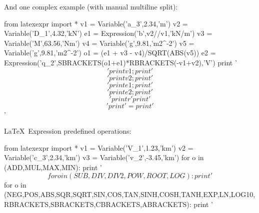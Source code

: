 \documentclass{report}
\begin{document}
And one complex example (with manual multiline split):
\begin{python}
	from latexexpr import *
	v1 = Variable('a_3',2.34,'m')
	v2 = Variable('D_1',4.32,'kN')
	e1 = Expression('b',v2//v1,'kN/m')
	v3 = Variable('M',63.56,'Nm')
	v4 = Variable('g',9.81,'m2^{-2}')
	v5 = Variable('g',9.81,'m2^{-2}')
	o1 = (e1 + v3 - v4)/SQRT(ABS(v5))
	e2 = Expression('q_2',SBRACKETS(o1+e1)*RBRACKETS(-v1+v2),'V')
	print '$$'
	print v1; print '$$\n$$'
	print v2; print '$$\n$$'
	print e1; print '$$\n$$'
	print e2; print '$$\n$$'
	print r'%
	print '$$\n$$'
	print '= %
	print '$$'
\end{python}

\LaTeX\ Expression predefined operations:
\begin{python}
	from latexexpr import *
	v1 = Variable('V_1',1.23,'km')
	v2 = Variable('c_3',2.34,'km')
	v3 = Variable('v_2',-3.45,'km')
	for o in (ADD,MUL,MAX,MIN):
	   print '$$ %
	for o in (SUB,DIV,DIV2,POW,ROOT,LOG):
	   print '$$ %
	for o in (NEG,POS,ABS,SQR,SQRT,SIN,COS,TAN,SINH,COSH,TANH,EXP,LN,LOG10,RBRACKETS,SBRACKETS,CBRACKETS,ABRACKETS):
	   print '$$ %
\end{python}
\end{document}
